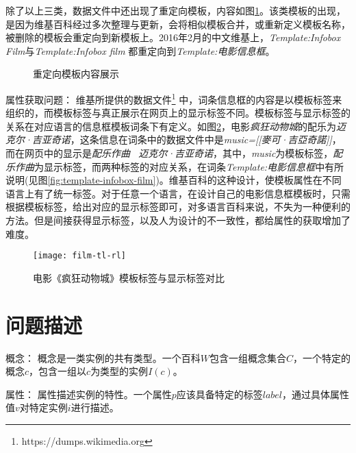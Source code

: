 除了以上三类，数据文件中还出现了{\heiti 重定向模板}，内容如图\ref{fig:template-redirect}。该类模板的出现，是因为维基百科经过多次整理与更新，会将相似模板合并，或重新定义模板名称，被删除的模板会重定向到新模板上。2016年2月的中文维基上，\textit{Template:Infobox Film}与\textit{Template:Infobox film} 都重定向到\textit{Template:电影信息框}。

\begin{figure}[ht]
  \centering
  \caption{重定向模板内容展示}
  \label{fig:template-redirect}
\end{figure}

{\heiti 属性获取问题：}
维基所提供的数据文件\footnote{https://dumps.wikimedia.org} 中，词条信息框的内容是以{\heiti 模板标签}来组织的，而模板标签与真正展示在网页上的{\heiti 显示标签}不同。模板标签与显示标签的关系在对应语言的信息框模板词条下有定义。如图\ref{fig:film-tl-rl}，电影\textit{疯狂动物城}的配乐为\textit{迈克尔·吉亚奇诺}，这条信息在词条中的数据文件中是\textit{music=[[麥可·吉亞奇諾]]}，而在网页中的显示是\textit{配乐作曲 \ 迈克尔·吉亚奇诺}，其中，\textit{music}为模板标签，\textit{配乐作曲}为显示标签，而两种标签的对应关系，在词条\textit{Template:电影信息框}中有所说明(见图\ref{fig:template-infobox-film})。维基百科的这种设计，使模板属性在不同语言上有了统一标签。对于任意一个语言，在设计自己的电影信息框模板时，只需根据模板标签，给出对应的显示标签即可，对多语言百科来说，不失为一种便利的方法。但是间接获得显示标签，以及人为设计的不一致性，都给属性的获取增加了难度。

\begin{figure}[ht]
  \centering
  \texttt{[image: film-tl-rl]}
  \caption{电影《疯狂动物城》模板标签与显示标签对比}
  \label{fig:film-tl-rl}
\end{figure}

\section{问题描述}

\begin{definition}
{\heiti 概念：}
概念是一类实例的共有类型。一个百科$W$包含一组概念集合$C$，一个特定的概念$c$，包含一组以$c$为类型的实例$I(c)$。
\end{definition}

\begin{definition}
{\heiti 属性：} 属性描述实例的特性。一个属性$p$应该具备特定的标签$label$，通过具体属性值$v$对特定实例$i$进行描述。
\end{definition}

